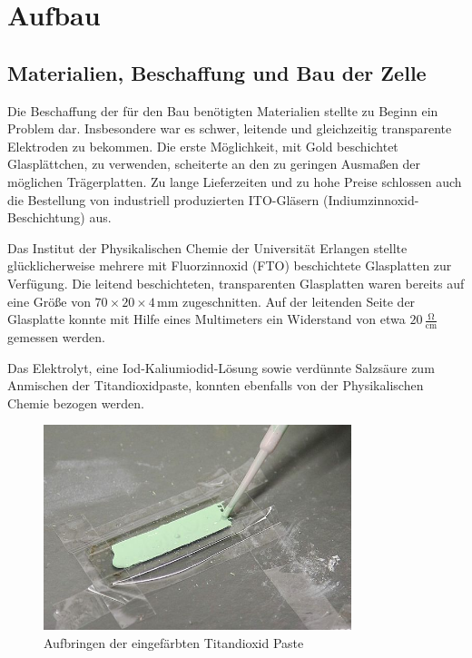 \documentclass[11pt]{scrartcl}
\newcommand{\unit}[1]{\ensuremath{\,\mathrm{#1}}} %
\begin{document}
\section{Aufbau}
\subsection{Materialien, Beschaffung und Bau der Zelle}
Die Beschaffung der f\"ur den Bau ben\"otigten Materialien stellte zu Beginn ein Problem dar. Insbesondere war es schwer, leitende und gleichzeitig transparente Elektroden zu bekommen. Die erste M\"oglichkeit, mit Gold beschichtet Glaspl\"attchen, zu verwenden, scheiterte an den zu geringen Ausma\ss{}en der m\"oglichen Tr\"agerplatten. Zu lange Lieferzeiten und zu hohe Preise schlossen auch die Bestellung von industriell produzierten ITO-Gl\"asern (Indiumzinnoxid-Beschichtung) aus.

Das Institut der Physikalischen Chemie der Universit\"at Erlangen stellte gl\"ucklicherweise mehrere mit Fluorzinnoxid (FTO) beschichtete Glasplatten zur Verf\"ugung. Die leitend beschichteten, transparenten Glasplatten waren bereits auf eine Gr\"o\ss{}e von \(70\times 20 \times 4 \unit{mm}\) zugeschnitten. Auf der leitenden Seite der Glasplatte konnte mit Hilfe eines Multimeters ein Widerstand von etwa \(20 \unit{\frac{\Omega}{cm}}\) gemessen werden.

Das Elektrolyt, eine Iod-Kaliumiodid-L\"osung sowie verd\"unnte Salzs\"aure zum Anmischen der Titandioxidpaste, konnten ebenfalls von der Physikalischen Chemie bezogen werden.

\begin{figure}[ht]
\begin{center}
\includegraphics[width=0.8\textwidth]{images/herstellung_pipette.jpg}
\end{center}
\vspace{-1.5\baselineskip}
\caption{Aufbringen der eingefärbten Titandioxid Paste}
\label{herstellung_pipette}
\end{figure}
\end{document}
